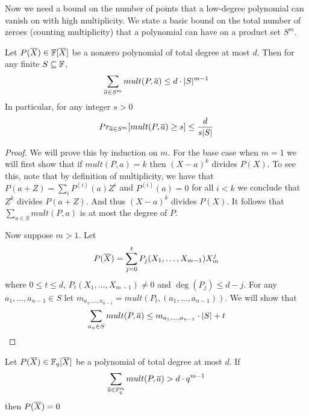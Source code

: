 Now we need a bound on the number of points that a low-degree polynomial can vanish on with high multiplicity. We state a basic bound on the total number of zeroes (counting multiplicity) that a polynomial can have on a product set $S^m$.
\begin{theorem}\label{multplicitybound}
	Let $P(\overline{X})\in \mathbb{F}[\overline{X}]$ be a nonzero polynomial of total degree at most $d$. Then for any finite $S\subseteq \mathbb{F}$, $$\sum_{\overline{a}\in S^m} mult(P,\overline{a})\leq d\cdot |S|^{m-1}$$In particular, for any integer $s>0$ $$Pr_{\overline{a}\in S^m}[mult(P,\overline{a})\geq s]\leq \frac{d}{s|S|}$$
\end{theorem}
\begin{proof}
	We will prove this by induction on $m$. For the base case when $m=1$ we will first show that if $mult(P,a)=k$ then $(X-a)^k$ divides $P(X)$. To see this, note that by definition of multiplicity, we have that $P(a+Z)=\sum\limits_{i}P^{(i)}(a)Z^{i}$ and $P^{(i)}(a)=0$ for all $i<k$ we conclude that $Z^k$ divides $P(a+Z)$. And thus $(X-a)^k$ divides $P(X)$. It follows that $\sum\limits_{a\in S} mult(P,a)$ is at most the degree of $P$. 
	
	Now suppose $m>1$. Let $$P(\overline{X})=\sum_{j=0}^t P_j(X_1,\dots, X_{m-1})X^j_m$$where $0\leq t\leq d$, $P_t(X_1,\dots, X_{m-1})\neq 0$ and $\deg(P_j)\leq d-j$. For any $a_1,\dots, a_{n-1}\in S$ let $m_{a_1,\dots, a_{n-1}}=mult(P_t,(a_1,\dots, a_{n-1}))$. We will show that $$\sum_{a_n\in S}mult(P, \overline{a})\leq m_{a_1,\dots,a_{n-1}}\cdot |S|+t$$
\end{proof}
\begin{corollary}
	Let $P(\overline{X})\in \mathbb{F}_q[\overline{X}]$ be a polynomial of total degree at most $d$. If $$\sum_{\overline{a}\in \mathbb{F}_q^m}mult(P,\overline{a})>d\cdot q^{m-1}$$then $P(\overline{X})=0$
\end{corollary}